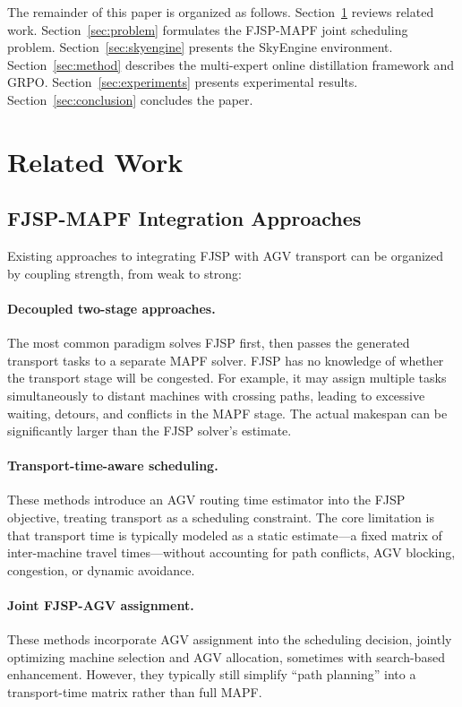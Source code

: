 \documentclass[11pt,a4paper]{article}
\begin{document}
The remainder of this paper is organized as follows. Section~\ref{sec:related} reviews related work. Section~\ref{sec:problem} formulates the FJSP-MAPF joint scheduling problem. Section~\ref{sec:skyengine} presents the SkyEngine environment. Section~\ref{sec:method} describes the multi-expert online distillation framework and GRPO. Section~\ref{sec:experiments} presents experimental results. Section~\ref{sec:conclusion} concludes the paper.


\section{Related Work}
\label{sec:related}

\subsection{FJSP-MAPF Integration Approaches}

Existing approaches to integrating FJSP with AGV transport can be organized by coupling strength, from weak to strong:

\paragraph{Decoupled two-stage approaches.}
The most common paradigm solves FJSP first, then passes the generated transport tasks to a separate MAPF solver. FJSP has no knowledge of whether the transport stage will be congested. For example, it may assign multiple tasks simultaneously to distant machines with crossing paths, leading to excessive waiting, detours, and conflicts in the MAPF stage. The actual makespan can be significantly larger than the FJSP solver's estimate.

\paragraph{Transport-time-aware scheduling.}
These methods introduce an AGV routing time estimator into the FJSP objective, treating transport as a scheduling constraint. The core limitation is that transport time is typically modeled as a static estimate---a fixed matrix of inter-machine travel times---without accounting for path conflicts, AGV blocking, congestion, or dynamic avoidance.

\paragraph{Joint FJSP-AGV assignment.}
These methods incorporate AGV assignment into the scheduling decision, jointly optimizing machine selection and AGV allocation, sometimes with search-based enhancement. However, they typically still simplify ``path planning'' into a transport-time matrix rather than full MAPF.
\end{document}
